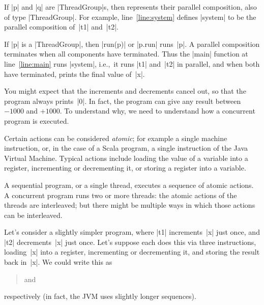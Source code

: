 If |p| and |q| are |ThreadGroup|s, then  represents their
parallel composition, also of type |ThreadGroup|.  For example,
line~\ref{line:system} defines |system| to be the parallel composition of~|t1|
and~|t2|. 

If |p| is a |ThreadGroup|, then |run(p)| or |p.run| runs~|p|.  A parallel
composition terminates when all components have terminated.  Thus the |main|
function at line~\ref{line:main} runs |system|, i.e.,~it runs |t1| and~|t2| in
parallel, and when both have terminated, prints the final value of~|x|.

You might expect that the increments and decrements cancel out, so that the
program always prints~|0|.  In fact, the program can give any result between
$-1000$ and $+1000$.
%
To understand why, we need to understand how a concurrent program is
executed. 
 
Certain actions can be considered \emph{atomic}; for example a single machine
instruction, or, in the case of a Scala program, a single instruction of the
Java Virtual Machine.  Typical actions include loading the value of a variable
into a register, incrementing or decrementing it, or storing a register into a
variable.

A sequential program, or a single thread, executes a sequence of atomic
actions.  
%
A concurrent program runs two or more threads: the atomic actions of the
threads are interleaved; but there might be multiple ways in which those
actions can be interleaved.

Let's consider a slightly simpler program, where |t1| increments~|x| just
once, and |t2| decrements~|x| just once.  Let's suppose each does this via three
instructions, loading~|x| into a register, incrementing or decrementing it,
and storing the result back in~|x|.  We could write this as
\begin{quote}
 \qquad and \qquad {}
\end{quote}
respectively (in fact, the JVM uses slightly longer sequences).

